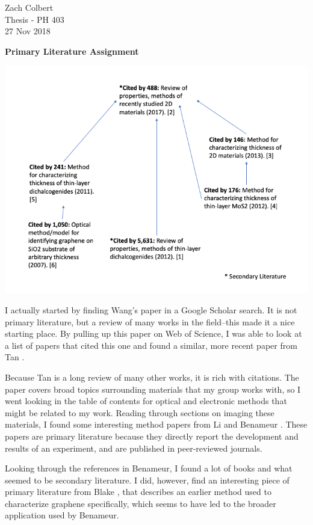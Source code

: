 \documentclass{article}
\begin{document}
  \begin{flushright}
    Zach Colbert \\
    Thesis - PH 403 \\
    27 Nov 2018 \\
  \end{flushright}

  \begin{center}
    \textbf{Primary Literature Assignment} \\
  \end{center}

  \includegraphics[width=\textwidth]{map.png}

  I actually started by finding Wang's paper \cite{wang_electronics_2012} in a Google Scholar search. It is not primary literature, but a review of many works in the field--this made it a nice starting place. By pulling up this paper on Web of Science, I was able to look at a list of papers that cited this one and found a similar, more recent paper from Tan \cite{tan_recent_2017}. \par

  Because Tan is a long review of many other works, it is rich with citations. The paper covers broad topics surrounding materials that my group works with, so I went looking in the table of contents for optical and electronic methods that might be related to my work. Reading through sections on imaging these materials, I found some interesting method papers from Li \cite{li_optical_2012,li_rapid_2013} and Benameur \cite{benameur_visibility_2011}. These papers are primary literature because they directly report the development and results of an experiment, and are published in peer-reviewed journals. \par

  Looking through the references in Benameur, I found a lot of books and what seemed to be secondary literature. I did, however, find an interesting piece of primary literature from Blake \cite{blake_making_2007}, that describes an earlier method used to characterize graphene specifically, which seems to have led to the broader application used by Benameur.

  \newpage

  \printbibliography
\end{document}
